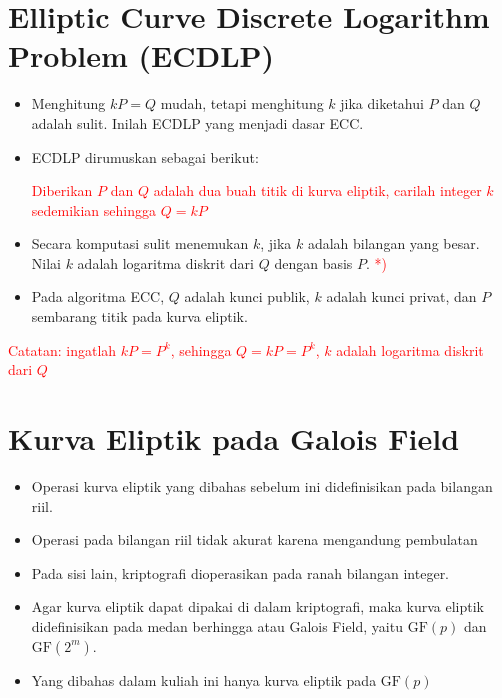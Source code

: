 \documentclass{article}
\begin{document}
\newpage


\section*{Elliptic Curve Discrete Logarithm Problem (ECDLP)}

\begin{itemize}
    \item Menghitung $kP = Q$ mudah, tetapi menghitung $k$ jika diketahui $P$ dan $Q$ adalah sulit. Inilah ECDLP yang menjadi dasar ECC.
    \item ECDLP dirumuskan sebagai berikut:
    
    \textcolor{red}{Diberikan $P$ dan $Q$ adalah dua buah titik di kurva eliptik, carilah integer $k$ sedemikian sehingga $Q = kP$}
    
    \item Secara komputasi sulit menemukan $k$, jika $k$ adalah bilangan yang besar. Nilai $k$ adalah logaritma diskrit dari $Q$ dengan basis $P$. \textcolor{red}{*)}
    \item Pada algoritma ECC, $Q$ adalah kunci publik, $k$ adalah kunci privat, dan $P$ sembarang titik pada kurva eliptik.
\end{itemize}

\centering
\textcolor{red}{Catatan: ingatlah $kP = P^k$, sehingga $Q = kP = P^k$, $k$ adalah logaritma diskrit dari $Q$}

\newpage


\section*{Kurva Eliptik pada Galois Field}

\begin{itemize}
    \item Operasi kurva eliptik yang dibahas sebelum ini didefinisikan pada bilangan riil.
    \item Operasi pada bilangan riil tidak akurat karena mengandung pembulatan
    \item Pada sisi lain, kriptografi dioperasikan pada ranah bilangan integer.
    \item Agar kurva eliptik dapat dipakai di dalam kriptografi, maka kurva eliptik didefinisikan pada medan berhingga atau Galois Field, yaitu $\text{GF}(p)$ dan $\text{GF}(2^m)$.
    \item Yang dibahas dalam kuliah ini hanya kurva eliptik pada $\text{GF}(p)$
\end{itemize}
\end{document}
